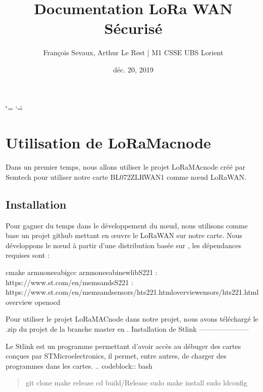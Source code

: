 \documentclass[letterpaper,10pt,french]{sphinxmanual}
\title{Documentation LoRa WAN Sécurisé}
\date{déc. 20, 2019}
\author{François Sevaux, Arthur Le Rest | M1 CSSE UBS Lorient}
\begin{document}
\ifdefined\shorthandoff
  \ifnum\catcode`\=\string=\active\shorthandoff{=}\fi
  \ifnum\catcode`\"=\active{}\fi
\fi

\pagestyle{empty}
\sphinxmaketitle
\pagestyle{plain}
\sphinxtableofcontents
\pagestyle{normal}
\label{\detokenize{index::doc}}



\chapter{Utilisation de LoRaMac\sphinxhyphen{}node}
\label{\detokenize{UtilisationLoRa-Node:utilisation-de-loramac-node}}\label{\detokenize{UtilisationLoRa-Node::doc}}
Dans un premier temps, nous allons utiliser le projet LoRaMAc\sphinxhyphen{}node créé par Semtech pour utiliser notre carte B\sphinxhyphen{}L072Z\sphinxhyphen{}LRWAN1 comme nœud LoRaWAN.


\section{Installation}
\label{\detokenize{UtilisationLoRa-Node:installation}}
Pour gagner du temps dans le développement du nœud, nous utilisons comme base un projet github  mettant en œuvre le LoRaWAN sur notre carte.
Nous développons le nœud à partir d’une distribution  basée sur , les dépendances requises sont :

\begin{sphinxVerbatim}[commandchars=\\\{\}]
cmake
arm\PYGZhy{}none\PYGZhy{}eabi\PYGZhy{}gcc
arm\PYGZhy{}none\PYGZhy{}eabi\PYGZhy{}newlibS221 : https://www.st.com/en/mems\PYGZhy{}and\PYGZhy{}sS221 : https://www.st.com/en/mems\PYGZhy{}and\PYGZhy{}sensors/hts221.html\PYGZsh{}overviewensors/hts221.html\PYGZsh{}overview
openocd
\end{sphinxVerbatim}

Pour utiliser le projet LoRaMAC\sphinxhyphen{}node dans notre projet, nous avons téléchargé le .zip du projet de la branche master en .
Installation de Stlink
———————\sphinxhyphen{}

Le St\sphinxhyphen{}link est un programme permettant d’avoir accès au débuger des cartes conçues par STMicroelectronics, il permet, entre autres, de charger des programmes dans les cartes.
.. code\sphinxhyphen{}block:: bash
\begin{quote}

git clone 
make release
cd build/Release
sudo make install
sudo ldconfig
\end{quote}
\end{document}
